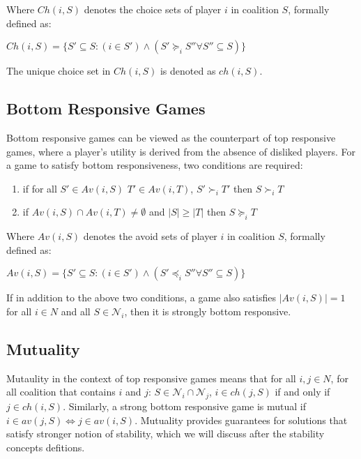\documentclass[letterpaper]{article} %
\begin{document}
Where $Ch(i, S)$ denotes the choice sets of player $i$ in coalition $S$, formally defined as:

$Ch(i, S) = \{S' \subseteq S: (i \in S') \wedge (S' \succeq_i S'' \forall S'' \subseteq S)\}$

The unique choice set in $Ch(i, S)$ is denoted as $ch(i, S)$.

\subsection{Bottom Responsive Games}
Bottom responsive games can be viewed as the counterpart of top responsive games, where a player's utility is derived from the absence of disliked players. For a game to satisfy bottom responsiveness, two conditions are required:

\begin{enumerate}
  \item if for all $S' \in Av(i, S)$ $T' \in Av(i, T)$, $ S' \succ_i T'$ then $S \succ_i T$
  \item if $Av(i, S) \cap Av(i, T) \neq \emptyset$ and $|S| \geq |T|$ then $S \succeq_i T$
\end{enumerate}

Where $Av(i, S)$ denotes the avoid sets of player $i$ in coalition $S$, formally defined as:

$Av(i, S) = \{S' \subseteq S: (i \in S') \wedge (S' \preceq_i S'' \forall S'' \subseteq S)\}$

If in addition to the above two conditions, a game also satisfies $|Av(i, S)| = 1$ for all $i \in N$ and all $S \in \mathcal{N}_i$, then it is strongly bottom responsive.

\subsection{Mutuality}
Mutaulity in the context of top responsive games means that for all $i, j \in N$, for all coalition that contains $i$ and $j$: $S \in \mathcal{N}_i \cap \mathcal{N}_j$, $i \in ch(j, S)$ if and only if $j \in ch(i, S)$. Similarly, a strong bottom responsive game is mutual if $i \in av(j, S) \iff j \in av(i, S)$. Mutuality provides guarantees for solutions that satisfy stronger notion of stability, which we will discuss after the stability concepts defitions.
\end{document}
